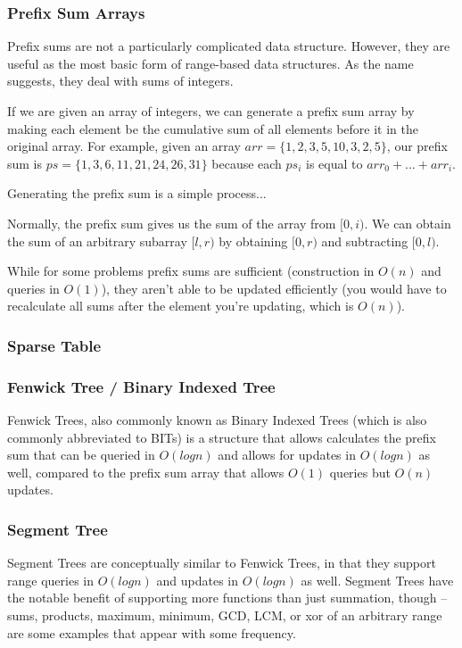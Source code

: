 \subsubsection{Prefix Sum Arrays}

Prefix sums are not a particularly complicated data structure. However, they are useful as the most basic form of range-based data structures. As the name suggests, they deal with sums of integers.

If we are given an array of integers, we can generate a prefix sum array by making each element be the cumulative sum of all elements before it in the original array. For example, given an array $arr = \{1,2,3,5,10,3,2,5\}$, our prefix sum is $ps = \{1,3,6,11,21,24,26,31\}$ because each $ps_i$ is equal to $arr_0 + ... + arr_i$.

Generating the prefix sum is a simple process...

Normally, the prefix sum gives us the sum of the array from $[0,i)$. We can obtain the sum of an arbitrary subarray $[l,r)$ by obtaining $[0,r)$ and subtracting $[0,l)$. 

While for some problems prefix sums are sufficient (construction in $O(n)$ and queries in $O(1)$), they aren't able to be updated efficiently (you would have to recalculate all sums after the element you're updating, which is $O(n)$).

\subsubsection{Sparse Table}

\subsubsection{Fenwick Tree / Binary Indexed Tree}
 

Fenwick Trees, also commonly known as Binary Indexed Trees (which is also commonly abbreviated to BITs) is a structure that allows calculates the prefix sum that can be queried in $O(log n)$ and allows for updates in $O(log n)$ as well, compared to the prefix sum array that allows $O(1)$ queries but $O(n)$ updates.

\subsubsection{Segment Tree}

Segment Trees are conceptually similar to Fenwick Trees, in that they support range queries in $O(log n)$ and updates in $O(log n)$ as well. Segment Trees have the notable benefit of supporting more functions than just summation, though -- sums, products, maximum, minimum, GCD, LCM, or xor of an arbitrary range are some examples that appear with some frequency.

